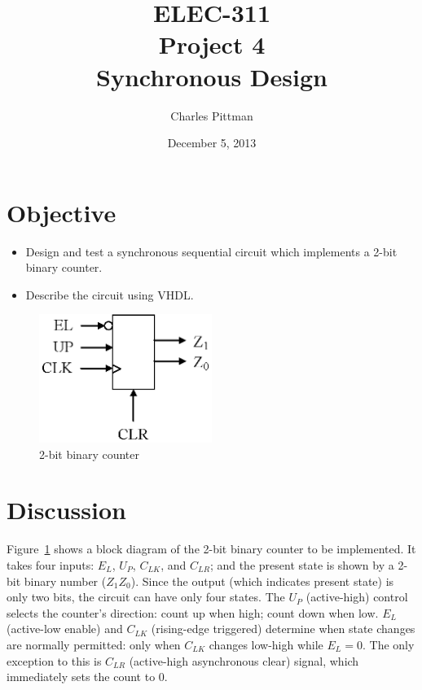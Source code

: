 \documentclass{report}
\author{Charles Pittman}
\title{ELEC-311\\ Project 4\\ Synchronous Design}
\date{December 5, 2013}
\begin{document}
\maketitle %



\section*{Objective}

\begin{itemize}
\item Design and test a synchronous sequential circuit which implements a 2-bit binary counter.
\item Describe the circuit using VHDL.
\end{itemize}

 \begin{figure}[hbtp]
   \centering
   \includegraphics[width=0.5\textwidth]{drawing}
   \caption{\label{fig:counter} 2-bit binary counter}
 \end{figure}

\section*{Discussion}

Figure~\ref{fig:counter} shows a block diagram of the 2-bit binary counter to be implemented.  It takes four inputs: $E_L$, $U_P$, $C_{LK}$, and $C_{LR}$; and the present state is shown by a 2-bit binary number ($Z_1Z_0$).  Since the output (which indicates present state) is only two bits, the circuit can have only four states.  The $U_P$ (active-high) control selects the counter's direction: count up when high; count down when low.  $E_L$ (active-low enable) and $C_{LK}$ (rising-edge triggered) determine when state changes are normally permitted: only when $C_{LK}$ changes low-high while $E_L = 0$.  The only exception to this is $C_{LR}$ (active-high asynchronous clear) signal, which immediately sets the count to 0.
\end{document}

